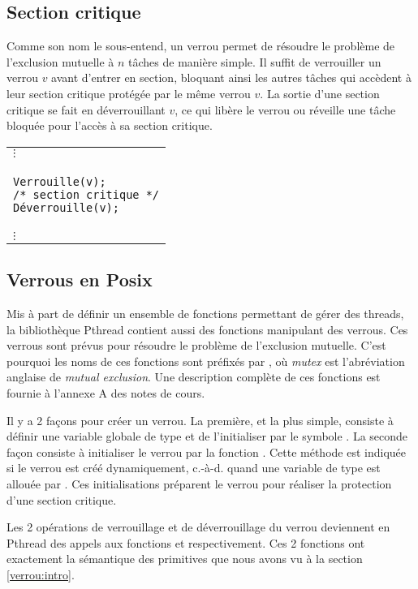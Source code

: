 \subsection{Section critique}
Comme son nom le sous-entend, un verrou permet de résoudre le problème de l'exclusion mutuelle à $n$ tâches de manière simple. Il suffit de verrouiller un verrou $v$ avant d'entrer en section, bloquant ainsi les autres tâches qui accèdent à leur section critique protégée par le même verrou $v$. La sortie d'une section critique se fait en déverrouillant $v$, ce qui libère le verrou ou réveille une tâche bloquée pour l'accès à sa section critique.
\centering
\vspace{-0.2 cm}
\begin{tabular}{l}
\hspace{0.6 cm}$\vdots$ \\
\begin{lstlisting}
Verrouille(v);
/* section critique */
Déverrouille(v);
\end{lstlisting} \\
\hspace{0.6 cm}$\vdots$
\end{tabular}


\subsection{Verrous en Posix}
Mis à part de définir un ensemble de fonctions permettant de gérer des threads, la bibliothèque Pthread contient aussi des fonctions manipulant des verrous.
Ces verrous sont prévus pour résoudre le problème de l'exclusion mutuelle. C'est pourquoi les noms de ces fonctions sont préfixés par , où {\em mutex} est l'abréviation anglaise de {\em mutual exclusion}. Une description complète de ces fonctions est fournie à l'annexe A des notes de cours.

Il y a 2 façons pour créer un verrou. La première, et la plus simple, consiste à définir une variable globale de type  et de l'initialiser par le symbole . La seconde façon consiste à initialiser le verrou par la fonction . Cette méthode est indiquée si le verrou est créé dynamiquement, c.-à-d. quand une variable de type  est allouée par . Ces initialisations préparent le verrou pour réaliser la protection d'une section critique.

Les 2 opérations de verrouillage et de déverrouillage du verrou deviennent en Pthread des appels aux fonctions  et  respectivement. Ces 2 fonctions ont exactement la sémantique des primitives que nous avons vu à la section \ref{verrou:intro}.


